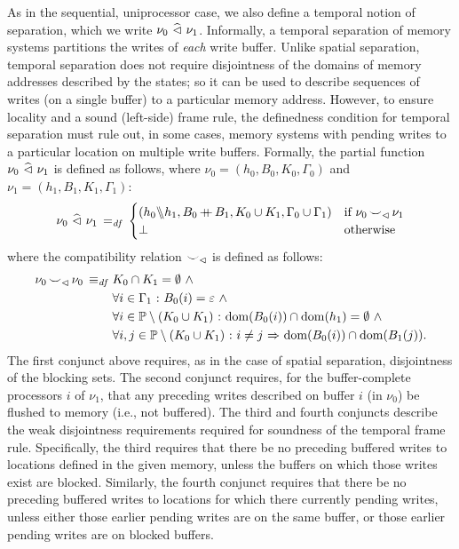 \documentclass[11pt]{report}
\begin{document}
As in the sequential, uniprocessor case, we also define a temporal notion of separation, which we write $\nu_0 \operatorname{\,\widehat{\vartriangleleft}\,} \nu_1$. Informally, a temporal separation of memory systems partitions the writes of \emph{each} write buffer. Unlike spatial separation, temporal separation does not require disjointness of the domains of memory addresses described by the states; so it can be used to describe sequences of writes (on a single buffer) to a particular memory address. However, to ensure locality and a sound (left-side) frame rule, the definedness condition for temporal separation must rule out, in some cases, memory systems with pending writes to a particular location on multiple write buffers. Formally, the partial function $\nu_0 \operatorname{\,\widehat{\vartriangleleft}\,} \nu_1$ is defined as follows, where $\nu_0 = (h_0,B_0,K_0,\Gamma_0)$ and $\nu_1 = (h_1,B_1,K_1,\Gamma_1)$:
\[ \nu_0 \operatorname{\,\widehat{\vartriangleleft}\,} \nu_1 \operatorname{\;=_{\mathit{df}}\;} \begin{cases}
  (h_0 \backslash\!\!\backslash h_1, B_0 \operatorname{+\!\!\!+} B_1, K_0 \cup K_1, \Gamma_0 \cup \Gamma_1) & \text{if $\nu_0 \operatorname{\smile}_\vartriangleleft \nu_1$} \\ 
  \bot & \text{otherwise}
\end{cases}\] where the compatibility relation $\operatorname{\smile}_\vartriangleleft$ is defined as follows: \begin{align*}
\nu_0 \operatorname{\smile}_\vartriangleleft \nu_0 \operatorname{\;\equiv_{\mathit{df}}\;} & K_0 \cap K_1 = \operatorname{\emptyset} \operatorname{\,\wedge\,} \\ 
  & \forall i \in \Gamma_1 \operatorname{\,:\,} B_0(i) = \varepsilon \operatorname{\,\wedge\,} \\ 
  & \forall i \in \mathbb{P} \setminus (K_0 \cup K_1) \operatorname{\,:\,} \operatorname{\mathrm{dom}}(B_0(i)) \cap \operatorname{\mathrm{dom}}(h_1) = \operatorname{\emptyset} \operatorname{\,\wedge\,} \\  
  & \forall i,j \in \mathbb{P} \setminus (K_0 \cup K_1) \operatorname{\,:\,} i \neq j \operatorname{\,\Rightarrow\,} \operatorname{\mathrm{dom}}(B_0(i)) \cap \operatorname{\mathrm{dom}}(B_1(j)). 
\end{align*} The first conjunct above requires, as in the case of spatial separation, disjointness of the blocking sets. The second conjunct requires, for the buffer-complete processors $i$ of $\nu_1$, that any preceding writes described on buffer $i$ (in $\nu_0$) be flushed to memory (i.e., not buffered). The third and fourth conjuncts describe the weak disjointness requirements required for soundness of the temporal frame rule. Specifically, the third requires that there be no preceding buffered writes to locations defined in the given memory, unless the buffers on which those writes exist are blocked. Similarly, the fourth conjunct requires that there be no preceding buffered writes to locations for which there currently pending writes, unless either those earlier pending writes are on the same buffer, or those earlier pending writes are on blocked buffers. 
\end{document}
